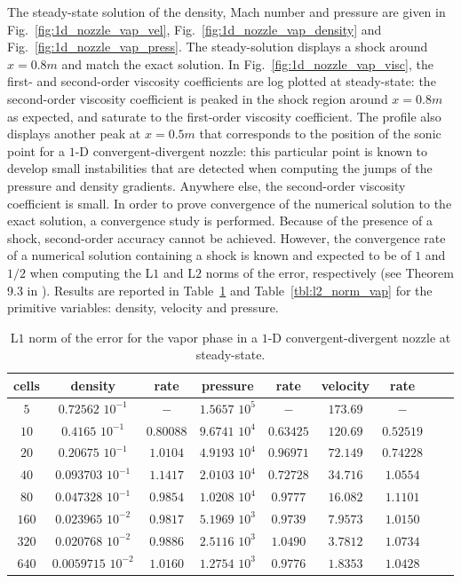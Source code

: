 \documentclass[preprint,10pt]{elsarticle}
\newcommand{\fig}[1]{Fig.~\ref{#1}}                      %
\newcommand{\tbl}[1]{Table~\ref{#1}}                     %
\begin{document}
The steady-state solution of the density, Mach number and pressure are given in \fig{fig:1d_nozzle_vap_vel}, \fig{fig:1d_nozzle_vap_density} and \fig{fig:1d_nozzle_vap_press}. The steady-solution displays a shock around $x=0.8m$ and match the exact solution. In \fig{fig:1d_nozzle_vap_visc}, the first- and second-order viscosity coefficients are log plotted at steady-state: the second-order viscosity coefficient is peaked in the shock region around $x=0.8m$ as expected, and saturate to the first-order viscosity coefficient. The profile also displays another peak at $x=0.5m$ that corresponds to the position of the sonic point for a $1$-D convergent-divergent nozzle: this particular point is known to develop small instabilities that are detected when computing the jumps of the pressure and density gradients. Anywhere else, the second-order viscosity coefficient is small. In order to prove convergence of the numerical solution to the exact solution, a convergence study is performed. Because of the presence of a shock, second-order accuracy cannot be achieved. However, the convergence rate of a numerical solution containing a shock  is known and expected to be of $1$ and $1/2$ when computing the L$1$ and L$2$ norms of the error, respectively (see Theorem 9.3 in \cite{convergence_book}). Results are reported in \tbl{tbl:l1_norm_vap} and \tbl{tbl:l2_norm_vap} for the primitive variables: density, velocity and pressure.
\begin{table}[H]
\begin{center}
 \caption{\label{tbl:l1_norm_vap} L$1$ norm of the error for the vapor phase in a $1$-D convergent-divergent nozzle at steady-state.}
 \begin{tabular}{|c|c|c|c|c|c|c|c|c|}
 \hline
   cells & density & rate & pressure & rate & velocity & rate \\
 \hline
$5$ &   $0.72562$ $10^{-1}$ & $-$ & $1.5657$ $10^{5}$ & $-$ & $173.69$                   & $-$\\
  \hline
$10$  &  $0.4165$ $10^{-1}$ & $0.80088$ & $9.6741$ $10^{4}$ & $0.63425$ & $120.69$ & $0.52519$\\
   \hline
$20$ & $0.20675$ $10^{-1}$ & $1.0104$ & $4.9193$ $10^{4}$ & $0.96971$ & $72.149$& $0.74228$\\
 \hline
$40$ & $0.093703$ $10^{-1}$ & $1.1417$ & $2.0103$ $10^{4}$ & $0.72728$ & $34.716$& $1.0554$\\
 \hline
$80$ & $0.047328$ $10^{-1}$ & $0.9854$ & $1.0208$ $10^{4}$ & $0.9777$ & $16.082$& $1.1101$\\
 \hline
$160$&$0.023965$ $10^{-2}$ & $0.9817$ & $5.1969$ $10^{3}$ & $0.9739$ & $7.9573$& $1.0150$\\
 \hline
$320$&$0.020768$ $10^{-2}$& $0.9886$ & $2.5116$ $10^{3}$ & $1.0490$ & $3.7812$& $1.0734$\\
 \hline
 $640$&$0.0059715$ $10^{-2}$& $1.0160$ & $1.2754$ $10^{3}$ & $0.9776$ & $1.8353$& $1.0428$\\
 \hline
\end{tabular}
\end{center}
\nonumber
\end{table}
\end{document}
